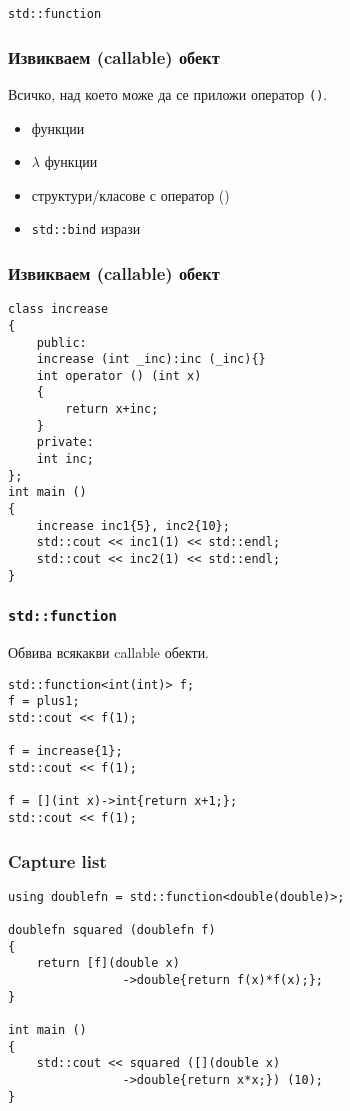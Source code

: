 \documentclass{beamer}
\begin{document}
\begin{frame}
    \centerline{\texttt{std::function}}
\end{frame}


\begin{frame}[fragile]
\frametitle{Извикваем (callable) обект}

Всичко, над което може да се приложи оператор \texttt{()}.

\begin{itemize}
    \item функции
    \item $\lambda$ функции
    \item структури/класове с оператор ()
    \item \texttt{std::bind} изрази
\end{itemize}

\end{frame}

\begin{frame}[fragile]
    \frametitle{Извикваем (callable) обект}

\begin{lstlisting}[basicstyle=\small]
class increase
{
    public:
    increase (int _inc):inc (_inc){}
    int operator () (int x)
    {
        return x+inc;
    }
    private:
    int inc;
};
int main ()
{
    increase inc1{5}, inc2{10};
    std::cout << inc1(1) << std::endl;
    std::cout << inc2(1) << std::endl;
}    
\end{lstlisting}    
\end{frame}
    

\begin{frame}[fragile]
    \frametitle{\texttt{std::function}}

Обвива всякакви callable обекти.
\bigskip

\begin{lstlisting}[basicstyle=\small]
std::function<int(int)> f;
f = plus1; 
std::cout << f(1);

f = increase{1}; 
std::cout << f(1);

f = [](int x)->int{return x+1;}; 
std::cout << f(1);
\end{lstlisting}    
\end{frame}



\begin{frame}[fragile]
    \frametitle{Capture list}
    
\begin{lstlisting}[basicstyle=\small]
using doublefn = std::function<double(double)>;

doublefn squared (doublefn f)
{ 
    return [f](double x)
                ->double{return f(x)*f(x);};
}

int main ()
{
    std::cout << squared ([](double x)
                ->double{return x*x;}) (10);
}
\end{lstlisting}
\end{frame}
\end{document}
